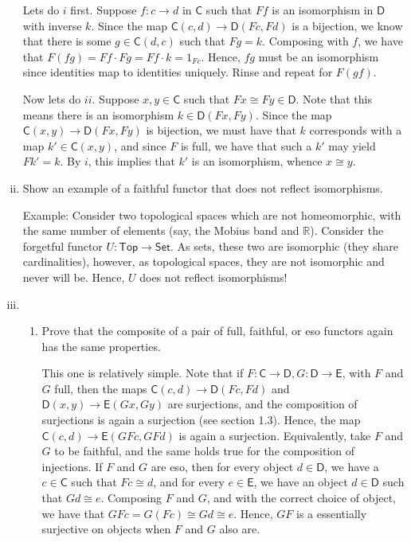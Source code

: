 \documentclass[10pt, oneside]{article}   	%
\newcommand{\cat}[1]{\bm{ \mathsf{#1} }}
\newcommand{\cc}{\cat{C}}
\newcommand{\dd}{\cat{D}}
\newcommand{\ee}{\cat{E}}
\begin{document}
\begin{enumerate}[(i)]
Lets do $i$ first. Suppose $f : c \to d$ in $\cc$ such that $Ff$ is an isomorphism in $\dd$ with inverse $k$. Since the map $\cc(c, d) \to \dd(Fc, Fd)$ is a bijection, we know that there is some $g \in \cc(d, c)$ such that $Fg = k$. Composing with $f$, we have that $F(fg) = Ff \cdot Fg = Ff \cdot k = 1_{Fc}$. Hence, $fg$ must be an isomorphism since identities map to identities uniquely. Rinse and repeat for $F(gf)$. 

Now lets do $ii$. Suppose $x, y \in \cc$ such that $Fx \cong Fy \in \dd$. Note that this means there is an isomorphism $k \in \dd(Fx, Fy)$. Since the map $\cc(x, y) \to \dd(Fx, Fy)$ is bijection, we must have that $k$ corresponds with a map $k' \in \cc(x, y)$, and since $F$ is full, we have that such a $k'$ may yield $Fk' = k$. By $i$, this implies that $k'$ is an isomorphism, whence $x \cong y$. 

\item Show an example of a faithful functor that does not reflect isomorphisms. 

Example: Consider two topological spaces which are not homeomorphic, with the same number of elements (say, the Mobius band and $\mathbb{R}$). Consider the forgetful functor $U : \cat{Top} \to \cat{Set}$. As sets, these two are isomorphic (they share cardinalities), however, as topological spaces, they are not isomorphic and never will be. Hence, $U$ does not reflect isomorphisms!


\item 
\begin{enumerate}[i]

	\item Prove that the composite of a pair of full, faithful, or eso functors again has the same properties.  
	
	This one is relatively simple. Note that if $F : \cc \to \dd, G: \dd \to \ee$, with $F$ and $G$ full, then the maps $\cc(c, d) \to \dd(Fc, Fd)$ and $\dd(x, y) \to \ee(Gx, Gy)$ are surjections, and the composition of surjections 		is again a surjection (see section 1.3). Hence, the map $\cc(c, d) \to \ee(GFc, GFd)$ is again a surjection. Equivalently, take $F$ and $G$ to be faithful, and the same holds true for the composition of  injections. If $F$ 			and $G$ are eso, then for every object $d \in \dd$, we have a $c \in \cc$ such that $Fc \cong d$, and for every $e \in \ee$, we have an object $d \in \dd$ such that $Gd \cong e$. Composing $F$ and $G$, and with the 		correct choice of object, we have that $GFc = G(Fc) \cong Gd \cong e$. Hence, $GF$ is a essentially surjective on objects when $F$ and $G$ also are. 


\end{enumerate}
\end{enumerate}
\end{document}
